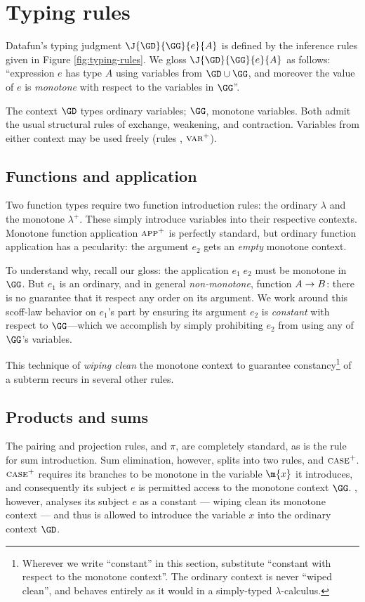 
\section{Typing rules}

Datafun's typing judgment $\J{\GD}{\GG}{e}{A}$ is defined by the inference rules
given in Figure \ref{fig:typing-rules}. We gloss $\J{\GD}{\GG}{e}{A}$ as
follows: ``expression $e$ has type $A$ using variables from $\GD \cup \GG$, and
moreover the value of $e$ is \emph{monotone} with respect to the variables in
$\GG$''.

The context $\GD$ types ordinary variables; $\GG$, monotone variables. Both
admit the usual structural rules of exchange, weakening, and contraction.
Variables from either context may be used freely (rules , $\textsc{var}^+$).

\subsection{Functions and application}
Two function types require two function introduction rules: the ordinary
$\lambda$ and the monotone $\lambda^+$. These simply introduce variables into
their respective contexts. Monotone function application $\textsc{app}^+$ is
perfectly standard, but ordinary function application  has a pecularity:
the argument $e_2$ gets an \emph{empty} monotone context.

To understand why, recall our gloss: the application $e_1\;e_2$ must be monotone
in $\GG$. But $e_1$ is an ordinary, and in general \emph{non-monotone}, function
$A \to B$: there is no guarantee that it respect any order on its argument. We
work around this scoff-law behavior on $e_1$'s part by ensuring its argument
$e_2$ is \emph{constant} with respect to $\GG$---which we accomplish by simply
prohibiting $e_2$ from using any of $\GG$'s variables.

This technique of \emph{wiping clean} the monotone context to guarantee
constancy\footnote{Wherever we write ``constant'' in this section, substitute
  ``constant with respect to the monotone context''. The ordinary context is
  never ``wiped clean'', and behaves entirely as it would in a simply-typed
  $\lambda$-calculus.} of a subterm recurs in several other rules. 

\subsection{Products and sums}
The pairing and projection rules,  and $\pi$, are completely standard,
as is the  rule for sum introduction. Sum elimination, however, splits
into two rules,  and $\textsc{case}^+$. $\textsc{case}^+$ requires its branches
to be monotone in the variable $\m{x}$ it introduces, and consequently its
subject $e$ is permitted access to the monotone context $\GG$. ,
however, analyses its subject $e$ as a constant --- wiping clean its monotone
context --- and thus is allowed to introduce the variable $x$ into the ordinary
context $\GD$. 

